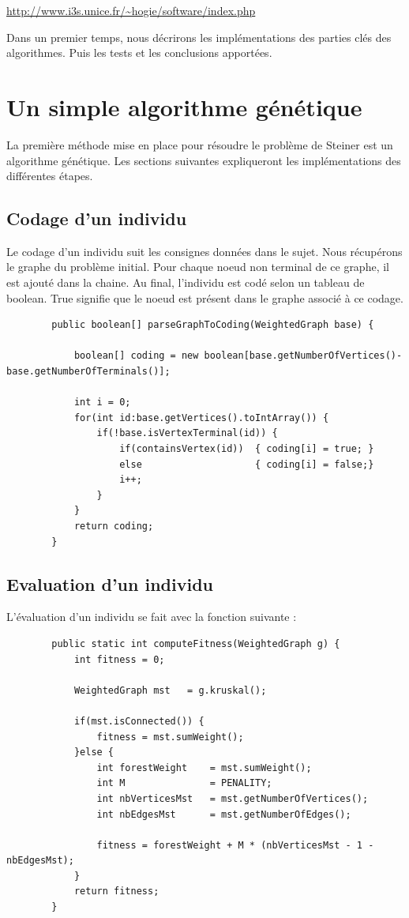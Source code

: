 \url{http://www.i3s.unice.fr/~hogie/software/index.php}

	Dans un premier temps, nous décrirons les implémentations des parties clés des algorithmes. Puis les tests et les conclusions apportées.

\newpage
\section{Un simple algorithme génétique}

	\pararaph{}La première méthode mise en place pour résoudre le problème de Steiner est un algorithme génétique. Les sections suivantes
expliqueront les implémentations des différentes étapes.

	\subsection{Codage d'un individu}

		Le codage d'un individu suit les consignes données dans le sujet. Nous récupérons le graphe du problème initial. Pour chaque noeud non terminal de ce graphe, il est ajouté dans la
chaine. Au final, l'individu est codé selon un tableau de boolean. True signifie que le noeud est présent dans le graphe associé à ce codage.

		\begin{lstlisting}
		public boolean[] parseGraphToCoding(WeightedGraph base) {

			boolean[] coding = new boolean[base.getNumberOfVertices()-base.getNumberOfTerminals()];

			int i = 0;
			for(int id:base.getVertices().toIntArray()) {
				if(!base.isVertexTerminal(id)) {
					if(containsVertex(id)) 	{ coding[i] = true; }
					else 					{ coding[i] = false;}
					i++;
				}
			}
			return coding;
		}
		\end{lstlisting}

	\subsection{Evaluation d'un individu}

		L'évaluation d'un individu se fait avec la fonction suivante :

		\begin{lstlisting}
		public static int computeFitness(WeightedGraph g) {
			int fitness = 0;

			WeightedGraph mst 	= g.kruskal();

			if(mst.isConnected()) {
				fitness = mst.sumWeight();
			}else {
				int forestWeight    = mst.sumWeight();
				int M               = PENALITY;
				int nbVerticesMst   = mst.getNumberOfVertices();
				int nbEdgesMst      = mst.getNumberOfEdges();

				fitness = forestWeight + M * (nbVerticesMst - 1 - nbEdgesMst);
			}
			return fitness;
		}
		\end{lstlisting}

